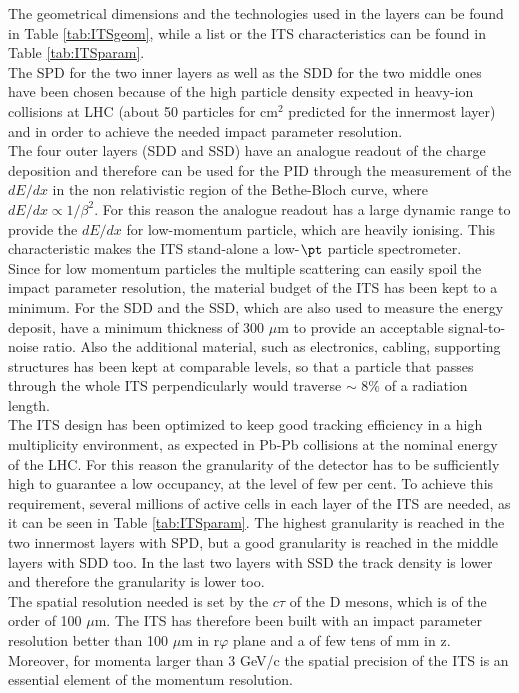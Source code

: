 %
The geometrical dimensions and the technologies used in the layers can be found in Table \ref{tab:ITSgeom}, while a list or the ITS characteristics can be found in Table \ref{tab:ITSparam}.\\
The SPD for the two inner layers as well as the SDD for the two middle ones have been chosen because of the high particle density expected in heavy-ion collisions at LHC (about 50 particles for cm$^2$ predicted for the innermost layer) and in order to achieve the needed impact parameter resolution.\\
The four outer layers (SDD and SSD) have an analogue  readout of the charge deposition and therefore can be used for the PID through the measurement of the $dE/dx$ in the non relativistic region of the Bethe-Bloch curve, where $dE/dx \propto 1/\beta^{2}$. For this reason the analogue readout has a large dynamic range to provide the $dE/dx$ for low-momentum particle, which are heavily ionising. This characteristic makes the ITS stand-alone a low-$\pt$ particle spectrometer.\\
Since for low momentum particles the multiple scattering can easily spoil the impact parameter resolution, the material budget of the ITS has been kept to a minimum. For the SDD and the SSD, which are also used to measure the energy deposit, have a minimum thickness of 300 $\mu$m to provide an acceptable signal-to-noise ratio. Also the additional material, such as electronics, cabling, supporting structures has been kept at comparable levels, so that a particle that passes through the whole ITS perpendicularly would traverse $\sim$ 8\% of a radiation length.\\
The ITS design has been optimized to keep good tracking efficiency in a high multiplicity environment, as expected in Pb-Pb collisions at the nominal energy of the LHC. For this reason the granularity of the detector has to be sufficiently high to guarantee a low occupancy, at the level of few  per cent. To achieve this requirement, several millions of active cells in each layer of the ITS are needed, as it can be seen in Table \ref{tab:ITSparam}. The highest granularity is reached in the two innermost layers with SPD,  but a good granularity is reached in the middle layers with SDD too. In the last two layers with SSD the track density is lower and therefore the granularity is lower too.\\
The spatial resolution needed is set by the $c\tau$ of the D mesons, which is of the order of 100 $\mu$m. The ITS has therefore been built with an impact parameter resolution better than 100 $\mu$m in r$\varphi$ plane and a of few tens of mm in z. Moreover, for momenta larger than 3 GeV/c the spatial precision of the ITS is an essential element of the momentum resolution.
